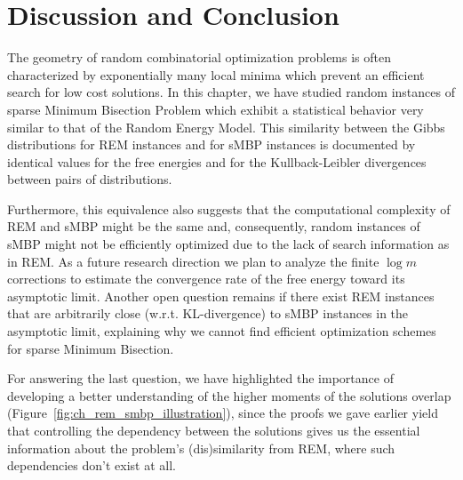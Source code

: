 \section{Discussion and Conclusion}
\label{sec:rem_conclusion}

The geometry of random combinatorial optimization problems is often
characterized by exponentially many local minima which prevent an
efficient search for low cost solutions. In this chapter, we have
studied random instances of sparse Minimum Bisection Problem which
exhibit a statistical behavior very similar to that of the Random Energy
Model. This similarity between the Gibbs distributions for REM
instances and for sMBP instances is documented by identical values for
the free energies and for the Kullback-Leibler divergences between
pairs of distributions. 

Furthermore, this equivalence also suggests that the computational complexity of
REM and sMBP might be the same and, consequently, random instances of sMBP might
not be efficiently optimized due to the lack of search information as in REM. As
a future research direction we plan to analyze the finite $\log m$ corrections
to estimate the convergence rate of the free energy toward its asymptotic limit.
Another open question remains if there exist REM instances that are arbitrarily
close (w.r.t. KL-divergence) to sMBP instances in the asymptotic limit,
explaining why we cannot find efficient optimization schemes for sparse Minimum
Bisection.

For answering the last question, we have highlighted the importance of developing a better
understanding of the higher moments of the solutions overlap
(Figure~\ref{fig:ch_rem_smbp_illustration}), since the proofs we gave earlier
yield that controlling the dependency between the solutions gives us the essential 
information about the problem's (dis)similarity from REM, where such dependencies
don't exist at all.
